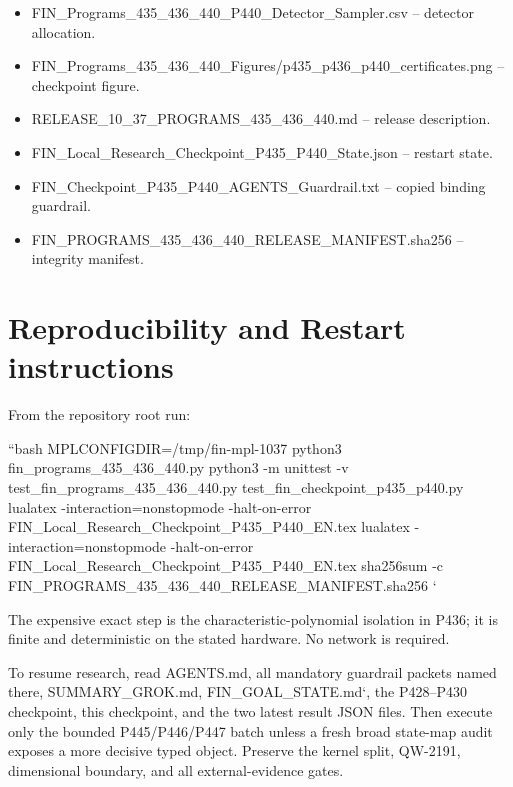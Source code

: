 \documentclass[11pt,a4paper,openany]{report}
\begin{document}
\begin{itemize}
\item 
FIN\_Programs\_435\_436\_440\_P440\_Detector\_Sampler.csv -- detector allocation.

\item 
FIN\_Programs\_435\_436\_440\_Figures/\allowbreak{}p435\_p436\_p440\_certificates.png -- checkpoint figure.

\item 
RELEASE\_10\_37\_PROGRAMS\_435\_436\_440.md -- release description.

\item 
FIN\_Local\_Research\_Checkpoint\_P435\_P440\_State.json -- restart state.

\item 
FIN\_Checkpoint\_P435\_P440\_AGENTS\_Guardrail.txt -- copied binding guardrail.

\item 
FIN\_PROGRAMS\_435\_436\_440\_RELEASE\_MANIFEST.sha256 -- integrity manifest.

\end{itemize}

\chapter{Reproducibility and Restart instructions}

From the repository root run:

``bash MPLCONFIGDIR=/\allowbreak{}tmp/\allowbreak{}fin-mpl-1037 python3 fin\_programs\_435\_436\_440.py python3 -m unittest -v test\_fin\_programs\_435\_436\_440.py test\_fin\_checkpoint\_p435\_p440.py lualatex -interaction=nonstopmode -halt-on-error FIN\_Local\_Research\_Checkpoint\_P435\_P440\_EN.tex lualatex -interaction=nonstopmode -halt-on-error FIN\_Local\_Research\_Checkpoint\_P435\_P440\_EN.tex sha256sum -c FIN\_PROGRAMS\_435\_436\_440\_RELEASE\_MANIFEST.sha256 `

The expensive exact step is the characteristic-polynomial isolation in P436; it is finite and deterministic on the stated hardware. No network is required.

To resume research, read AGENTS.md, all mandatory guardrail packets named there, SUMMARY\_GROK.md, FIN\_GOAL\_STATE.md`, the P428--P430 checkpoint, this checkpoint, and the two latest result JSON files. Then execute only the bounded P445/\allowbreak{}P446/\allowbreak{}P447 batch unless a fresh broad state-map audit exposes a more decisive typed object. Preserve the kernel split, QW-2191, dimensional boundary, and all external-evidence gates.
\end{document}
